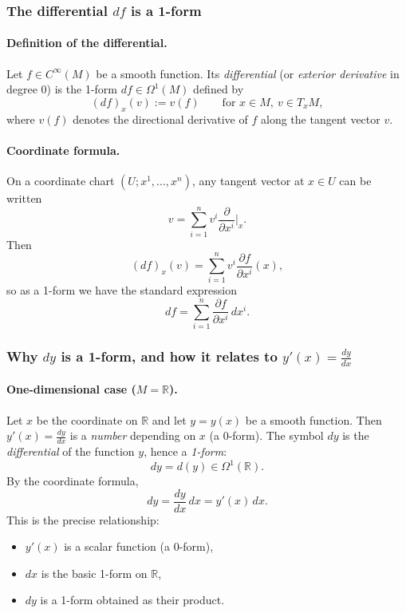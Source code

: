 \documentclass[12pt,a4paper]{article}
\theoremstyle{plain}
\theoremstyle{definition}      %
\begin{document}
\subsubsection*{The differential $df$ is a 1-form}

\paragraph{Definition of the differential.}
Let $f\in C^\infty(M)$ be a smooth function. Its \emph{differential} (or \emph{exterior derivative} in degree $0$)
is the 1-form $df\in\Omega^1(M)$ defined by
\[
(df)_x(v) := v(f)\qquad \text{for }x\in M,\ v\in T_xM,
\]
where $v(f)$ denotes the directional derivative of $f$ along the tangent vector $v$.

\paragraph{Coordinate formula.}
On a coordinate chart $(U; x^1,\dots,x^n)$, any tangent vector at $x\in U$ can be written
\[
v=\sum_{i=1}^n v^i \frac{\partial}{\partial x^i}\Big|_x.
\]
Then
\[
(df)_x(v)=\sum_{i=1}^n v^i \frac{\partial f}{\partial x^i}(x),
\]
so as a 1-form we have the standard expression
\[
df=\sum_{i=1}^n \frac{\partial f}{\partial x^i}\,dx^i.
\]

\subsubsection*{Why $dy$ is a 1-form, and how it relates to $y'(x)=\frac{dy}{dx}$}

\paragraph{One-dimensional case ($M=\mathbb{R}$).}
Let $x$ be the coordinate on $\mathbb{R}$ and let $y=y(x)$ be a smooth function.
Then $y'(x)=\frac{dy}{dx}$ is a \emph{number} depending on $x$ (a $0$-form).
The symbol $dy$ is the \emph{differential} of the function $y$, hence a \emph{1-form}:
\[
dy = d(y) \in \Omega^1(\mathbb{R}).
\]
By the coordinate formula,
\[
dy = \frac{dy}{dx}\,dx = y'(x)\,dx.
\]
This is the precise relationship:
\begin{itemize}
	\item $y'(x)$ is a scalar function (a $0$-form),
	\item $dx$ is the basic 1-form on $\mathbb{R}$,
	\item $dy$ is a 1-form obtained as their product.
\end{itemize}
\end{document}
